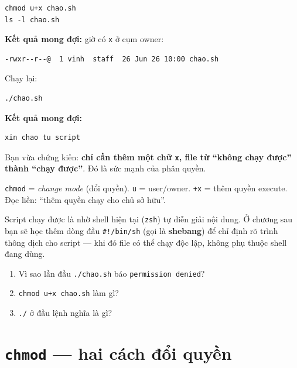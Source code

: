\documentclass[12pt,a4paper]{article}
\newcommand{\cmd}[1]{\texttt{#1}}
\begin{document}
\begin{labbox}
\begin{Verbatim}
chmod u+x chao.sh
ls -l chao.sh
\end{Verbatim}
\textbf{Kết quả mong đợi:} giờ có \cmd{x} ở cụm owner:
\begin{Verbatim}
-rwxr--r--@  1 vinh  staff  26 Jun 26 10:00 chao.sh
\end{Verbatim}
Chạy lại:
\begin{Verbatim}
./chao.sh
\end{Verbatim}
\textbf{Kết quả mong đợi:}
\begin{Verbatim}
xin chao tu script
\end{Verbatim}

Bạn vừa chứng kiến: \textbf{chỉ cần thêm một chữ \cmd{x}, file từ ``không chạy được''
thành ``chạy được''}. Đó là sức mạnh của phân quyền.
\end{labbox}

\begin{notebox}
\cmd{chmod} = \textit{change mode} (đổi quyền). \cmd{u} = user/owner. \cmd{+x} = thêm
quyền execute. Đọc liền: ``thêm quyền chạy cho chủ sở hữu''.
\end{notebox}

\begin{notebox}
Script chạy được là nhờ shell hiện tại (\cmd{zsh}) tự diễn giải nội dung. Ở chương
sau bạn sẽ học thêm dòng đầu \cmd{\#!/bin/sh} (gọi là \textbf{shebang}) để chỉ định
rõ trình thông dịch cho script --- khi đó file có thể chạy độc lập, không phụ thuộc
shell đang dùng.
\end{notebox}

\begin{checkbox}
\begin{enumerate}
\item Vì sao lần đầu \cmd{./chao.sh} báo \cmd{permission denied}?
\item \cmd{chmod u+x chao.sh} làm gì?
\item \cmd{./} ở đầu lệnh nghĩa là gì?
\end{enumerate}
\end{checkbox}

\section{\texttt{chmod} --- hai cách đổi quyền}
\end{document}
